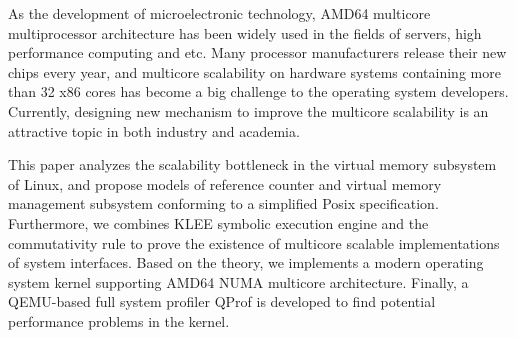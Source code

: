 
\begin{eabstract} 
	
	As the development of microelectronic technology, AMD64 multicore multiprocessor architecture has been widely used in the fields of servers, high performance
	computing and etc. Many processor manufacturers release their new chips every year, and multicore scalability on hardware systems containing more than 32 x86 cores has become a big challenge to the operating system developers. Currently,  designing new mechanism to improve the multicore scalability is an attractive 
	topic in both industry and academia.
	
	This paper analyzes the scalability bottleneck in the virtual memory subsystem of Linux, and propose models of reference counter and virtual memory management
	subsystem conforming to a simplified Posix specification. Furthermore, we combines KLEE symbolic execution engine and the commutativity rule 
	to prove the existence of multicore scalable implementations of system interfaces. Based on the theory, we implements a modern operating system kernel supporting
	AMD64 NUMA multicore  architecture. Finally, a QEMU-based full system profiler QProf is developed to find potential performance problems in the kernel.
\end{eabstract}

